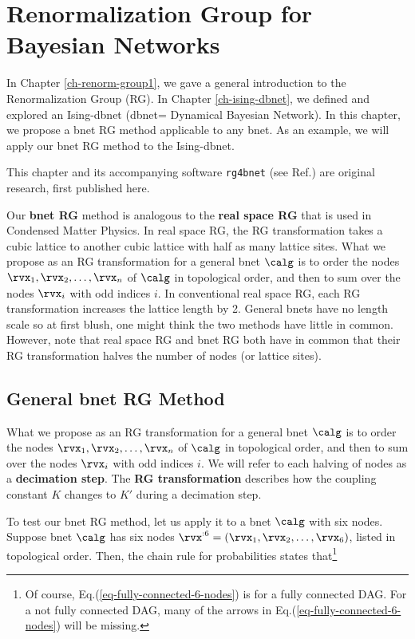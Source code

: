 
\chapter{Renormalization Group for
Bayesian Networks}
\label{ch-renorm-group2}

In Chapter \ref{ch-renorm-group1},
we gave a general introduction to the
Renormalization Group (RG).
In Chapter \ref{ch-ising-dbnet},
we defined and explored an Ising-dbnet (dbnet= Dynamical
Bayesian Network).
In this chapter,
we propose a bnet RG method
applicable to
any bnet.
As an example,
we will
apply our bnet RG method
to the Ising-dbnet.

This chapter and its accompanying software 
{\tt rg4bnet} (see Ref.\cite{rg4bnets}) are original research, first published here.


Our {\bf bnet RG} method  is analogous
to the {\bf real space RG} that  is
used in Condensed Matter Physics. In real space RG,
the RG transformation
takes a cubic lattice
to another cubic lattice
with half as many lattice sites.
What we propose as an RG transformation
for a general bnet $\calg$
is to order the nodes $\rvx_1, \rvx_2, \ldots,\rvx_n$
of $\calg$ in topological order, and 
then to sum over the nodes $\rvx_i$
with odd
indices  $i$.
In conventional real space
RG, each RG transformation
increases the lattice length
by 2. General
bnets have no length scale
so at first blush, one might think the two methods have little in common.
However, note that real space
RG and bnet RG
both have in common that
their RG transformation
halves the number of nodes (or
lattice sites).

\section{General bnet RG Method}

What we propose as an RG transformation
for a general bnet $\calg$
is to order the nodes $\rvx_1, \rvx_2, \ldots,\rvx_n$
of $\calg$ in topological order, and 
then to sum over the nodes $\rvx_i$
with odd indices $i$.
We will refer to each
halving of nodes as a 
{\bf  decimation step}.
The {\bf RG transformation}
describes how the coupling
constant $K$ changes to $K'$
during a decimation step.


To test our bnet RG method, let us apply it to
a bnet $\calg$
with six nodes. 
Suppose bnet $\calg$
has six nodes $\rvx^{:6}=
(\rvx_1, \rvx_2, \ldots, \rvx_6)$,
listed in topological
order. Then, the chain
rule for probabilities 
states that\footnote{
Of course, Eq.(\ref{eq-fully-connected-6-nodes}) is for
a
fully connected DAG.
For a not fully connected DAG, 
many of the arrows 
in Eq.(\ref{eq-fully-connected-6-nodes})
will be missing.}





